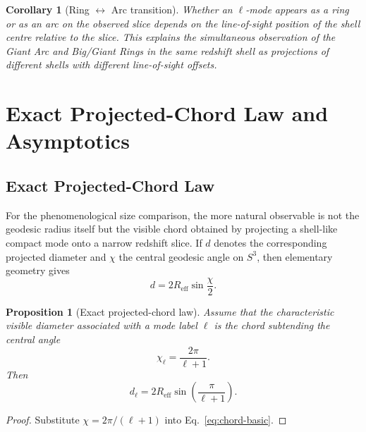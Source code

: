 \documentclass[
  aps,
  prd,
  reprint,
  superscriptaddress,
  nofootinbib,
  longbibliography,
  floatfix,
  amsmath,
  amssymb
]{revtex4-2}
\theoremstyle{plain}
\newtheorem{corollary}[theorem]{Corollary}
\newtheorem{proposition}[theorem]{Proposition}
\theoremstyle{definition}
\theoremstyle{remark}
\newcommand{\Reff}{R_{\mathrm{eff}}}
\begin{document}
\begin{corollary}[Ring $\leftrightarrow$ Arc transition]
  \label{cor:ringarc}
  Whether an $\ell$-mode appears as a ring or as an arc on the observed
  slice depends on the line-of-sight position of the shell centre
  relative to the slice. This explains the simultaneous observation
  of the Giant \emph{Arc} and Big/Giant \emph{Rings} in the same
  redshift shell as projections of different shells with different
  line-of-sight offsets.
\end{corollary}

\section{Exact Projected-Chord Law and Asymptotics}
\label{sec:fibonacci}

\subsection{Exact Projected-Chord Law}

For the phenomenological size comparison, the more natural observable is
not the geodesic radius itself but the visible chord obtained by
projecting a shell-like compact mode onto a narrow redshift slice. If
$d$ denotes the corresponding projected diameter and $\chi$ the central
geodesic angle on $S^3$, then elementary geometry gives
\begin{equation}
  d = 2\Reff \sin\frac{\chi}{2}.
  \label{eq:chord-basic}
\end{equation}

\begin{proposition}[Exact projected-chord law]
  \label{prop:chordlaw}
  Assume that the characteristic visible diameter associated with a mode
  label $\ell$ is the chord subtending the central angle
  \begin{equation}
    \chi_\ell = \frac{2\pi}{\ell+1}.
  \end{equation}
  Then
  \begin{equation}
    d_\ell = 2\Reff \sin\!\left(\frac{\pi}{\ell+1}\right).
    \label{eq:exactlaw}
  \end{equation}
\end{proposition}

\begin{proof}
  Substitute $\chi=2\pi/(\ell+1)$ into Eq.~\eqref{eq:chord-basic}.
\end{proof}
\end{document}
